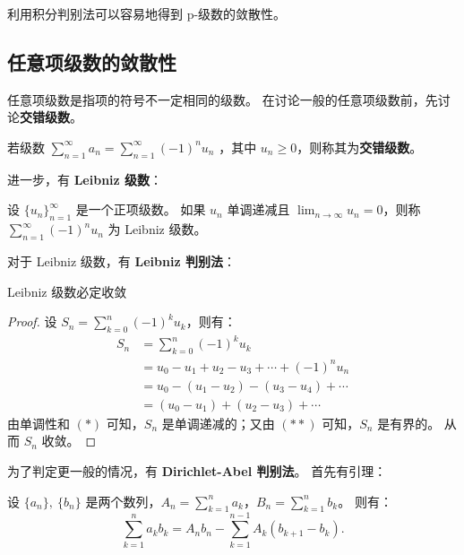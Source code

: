 利用积分判别法可以容易地得到 p-级数的敛散性。

\subsection{任意项级数的敛散性}\label{subsec:arbitrary-series-convergence}

任意项级数是指项的符号不一定相同的级数。
在讨论一般的任意项级数前，先讨论\textbf{交错级数}。

\begin{definition}[交错级数]\label{def:alternating-series}
  若级数 $\sum_{n=1}^{\infty} a_n = \sum_{n=1}^{\infty} (-1)^n u_n$ ，其中 $u_n \geq 0$，则称其为\textbf{交错级数}。
\end{definition}

进一步，有 \textbf{Leibniz 级数}：

\begin{definition}[Leibniz 级数]\label{def:leibniz-series}
  设 $\{u_n\}_{n=1}^{\infty}$ 是一个正项级数。
  如果 $u_n$ 单调递减且 $\lim_{n \to \infty} u_n = 0$，则称 $\sum_{n=1}^{\infty} (-1)^n u_n$ 为 Leibniz 级数。
\end{definition}

对于 Leibniz 级数，有 \textbf{Leibniz 判别法}：

\begin{theorem}\label{thm:leibniz-test}
  Leibniz 级数必定收敛
\end{theorem}

\begin{proof}
  设 $S_n = \sum_{k=0}^{n} (-1)^k u_k$，则有：
  \begin{align*}
    S_n &= \sum_{k=0}^{n} (-1)^k u_k \\
    &= u_0 - u_1 + u_2 - u_3 + \cdots + (-1)^n u_n \\
    &= u_0 - (u_1 - u_2) - (u_3 - u_4) + \cdots \tag*{(*)}\\
    &= (u_0 - u_1) + (u_2 - u_3) + \cdots \tag*{(**)}
  \end{align*}
  由单调性和 $(*)$ 可知，$S_n$ 是单调递减的；又由 $(**)$ 可知，$S_n$ 是有界的。
  从而 $S_n$ 收敛。
\end{proof}

为了判定更一般的情况，有 \textbf{Dirichlet-Abel 判别法}。
首先有引理：

\begin{lemma}[Abel 变换]\label{lem:abel-transformation}
  设 $\{a_n\},\ \{b_n\}$ 是两个数列，$A_n = \sum_{k=1}^{n} a_k$，$B_n = \sum_{k=1}^{n} b_k$。
  则有：
  \begin{equation*}
    \sum_{k=1}^{n} a_k b_k = A_n b_n - \sum_{k=1}^{n-1} A_k (b_{k+1} - b_k).
  \end{equation*}
\end{lemma}


